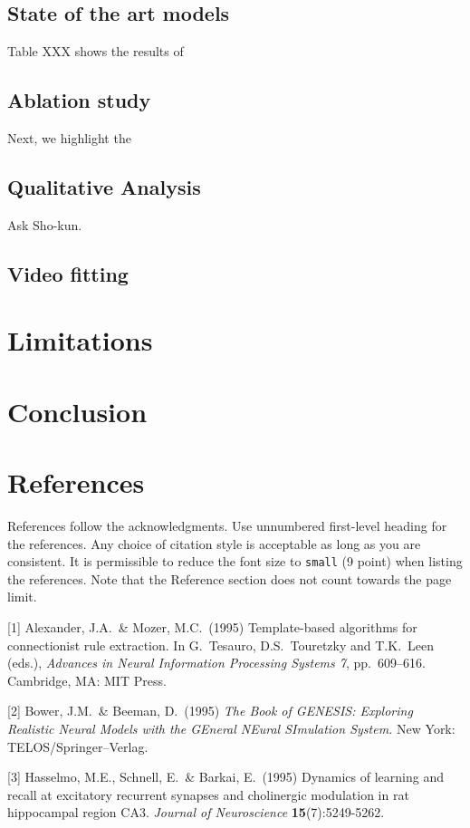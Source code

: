 \documentclass{article}
\begin{document}
\subsection{State of the art models}

Table XXX shows the results of

\subsection{Ablation study}

Next, we highlight the 

\subsection{Qualitative Analysis}

% 
Ask Sho-kun.

\subsection{Video fitting}



\section{Limitations}







\section{Conclusion}



\section*{References}
References follow the acknowledgments. Use unnumbered first-level heading for
the references. Any choice of citation style is acceptable as long as you are
consistent. It is permissible to reduce the font size to \verb+small+ (9 point)
when listing the references.
Note that the Reference section does not count towards the page limit.
\medskip

{
\small


[1] Alexander, J.A.\ \& Mozer, M.C.\ (1995) Template-based algorithms for
connectionist rule extraction. In G.\ Tesauro, D.S.\ Touretzky and T.K.\ Leen
(eds.), {\it Advances in Neural Information Processing Systems 7},
pp.\ 609--616. Cambridge, MA: MIT Press.


[2] Bower, J.M.\ \& Beeman, D.\ (1995) {\it The Book of GENESIS: Exploring
  Realistic Neural Models with the GEneral NEural SImulation System.}  New York:
TELOS/Springer--Verlag.


[3] Hasselmo, M.E., Schnell, E.\ \& Barkai, E.\ (1995) Dynamics of learning and
recall at excitatory recurrent synapses and cholinergic modulation in rat
hippocampal region CA3. {\it Journal of Neuroscience} {\bf 15}(7):5249-5262.
}
\end{document}

